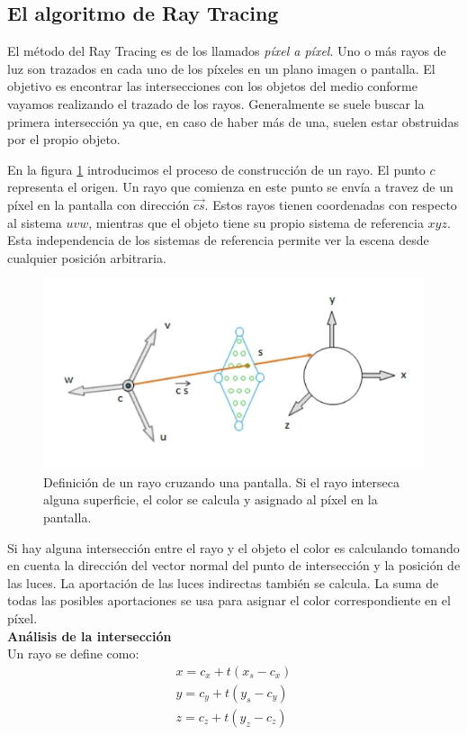 \subsection{El algoritmo de Ray Tracing}

El método del Ray Tracing es de los llamados{ \em píxel a píxel}. Uno o más rayos de luz son trazados en cada uno de los píxeles en un plano imagen o pantalla. El objetivo es encontrar las intersecciones con los objetos del medio conforme vayamos realizando el trazado de los rayos. Generalmente se suele buscar la primera intersección ya que, en caso de haber más de una, suelen estar obstruidas por el propio objeto.

En la figura \ref{florez27} introducimos el proceso de construcción de un rayo. El punto $c$ representa el origen. Un rayo que comienza en este punto se envía a travez de un píxel en la pantalla con dirección $\vec{cs}$. Estos rayos tienen coordenadas con respecto al sistema $uvw$, mientras que el objeto tiene su propio sistema de referencia $xyz$. Esta independencia de los sistemas de referencia permite ver la escena desde cualquier posición arbitraria.

\begin{figure}[h]
\centering
\includegraphics[scale=0.5]{images/florez2.png}
\caption{Definición de un rayo cruzando una pantalla. Si el rayo interseca alguna superficie, el color se calcula y asignado al píxel en la pantalla.}
\label{florez27}
\end{figure}

Si hay alguna intersección entre el rayo y el objeto el color es calculando tomando en cuenta la dirección del vector normal del punto de intersección y la posición de las luces. La aportación de las luces indirectas también se calcula. La suma de todas las posibles aportaciones se usa para asignar el color correspondiente en el píxel.
\[\]
\textbf{Análisis de la intersección}
\[\]
Un rayo se define como:
\begin{equation}
\begin{split}
x = c_x + t(x_s - c_x) \\
y = c_y + t(y_s - c_y) \\
z = c_z + t(y_z - c_z)
\end{split}
\nonumber
\end{equation}

